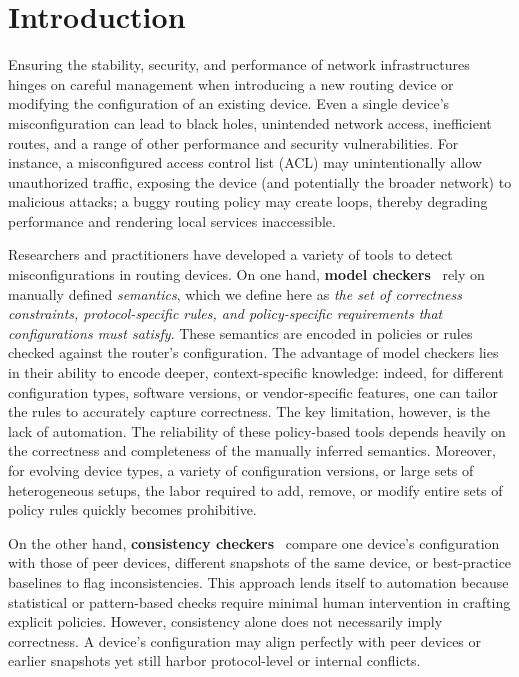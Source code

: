 
\section{Introduction}
\label{sec:intro}

Ensuring the stability, security, and performance of network infrastructures
hinges on careful management when introducing a new routing device or
modifying the configuration of an existing device. Even a single device's
misconfiguration can lead to black holes, unintended network access,
inefficient routes, and a range of other performance and security
vulnerabilities. For instance, a misconfigured access control list (ACL) may
unintentionally allow unauthorized traffic, exposing the device (and potentially
the broader network) to malicious attacks; a buggy routing policy may create
loops, thereby degrading performance and rendering local services inaccessible.

Researchers and practitioners have developed a variety of tools to detect
misconfigurations in routing devices. On one hand, \textbf{model
	checkers}~\cite{fogel2015general, beckett2017general, abhashkumar2020tiramisu,
	prabhu2020plankton, zhang2022sre, steffen2020netdice, ye2020hoyan,
	ritchey2000using,al2011configchecker, jeffrey2009model} rely on manually
defined \emph{semantics}, which we define here as \emph{the set of correctness
	constraints, protocol-specific rules, and policy-specific requirements that
	configurations must satisfy}. These semantics are encoded in policies or rules
checked against the router's configuration. The advantage of model checkers
lies in their ability to encode deeper, context-specific knowledge: indeed,
for different configuration types, software versions, or vendor-specific
features, one can tailor the rules to accurately capture correctness. The key
limitation, however, is the lack of automation. The reliability of these
policy-based tools depends heavily on the correctness and completeness of the
manually inferred semantics. Moreover, for evolving device types, a variety of
configuration versions, or large sets of heterogeneous setups, the labor
required to add, remove, or modify entire sets of policy rules quickly becomes
prohibitive.

On the other hand, \textbf{consistency
	checkers}~\cite{kakarla2024diffy,kakarla2020finding, le2006minerals,
	feamster2005detecting, tang2021campion, le2008detecting, le2006characterization}
compare one device’s configuration with those of peer devices, different
snapshots of the same device, or best-practice baselines to flag
inconsistencies. This approach lends itself to automation because statistical
or pattern-based checks require minimal human intervention in crafting
explicit policies. However, consistency alone does not necessarily imply
correctness. A device’s configuration may align perfectly with peer devices or
earlier snapshots yet still harbor protocol-level or internal conflicts.

